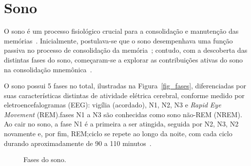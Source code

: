\section{Sono}

O sono é um processo fisiológico crucial para a consolidação e manutenção das memórias~\cite{blissittSleep2001, walkerSleep2006,
diekelmannMemory2010}. Inicialmente, postulava-se que o sono desempenhava uma função passiva no processo de consolidação da
memória~\cite{jenkinsObliviscence1924}; contudo, com a descoberta das distintas fases do sono, começaram-se a explorar as
contribuições ativas do sono na consolidação mnemônica~\cite{aserinskyRegularly1953}.

O sono possui 5 fases no total, ilustradas na Figura~\ref{fig_fases}, diferenciadas por suas características distintas de
atividade elétrica cerebral, conforme medido por eletroencefalogramas (EEG)\cite{silberVisual2007}: vigília (acordado), N1, N2, N3
e \textit{Rapid Eye Movement} (REM).\@As fases N1 a N3 são conhecidas como sono não-REM (NREM). Ao cair no sono, a fase N1 é a
primeira a ser atingida, seguida por N2, N3, N2 novamente e, por fim, REM;\@esse ciclo se repete ao longo da noite, com cada ciclo
durando aproximadamente de 90 a 110 minutos~\cite{k.patelPhysiology2022}.

\begin{figure}[!ht]
\caption{Fases do sono.}
\end{figure}

